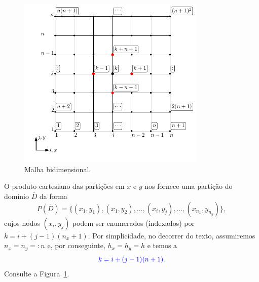 \begin{figure}[H]
  \centering
  \includegraphics[width=0.8\textwidth]{./cap_edp/dados/figMalha2D/fig}
  \caption{Malha bidimensional.}
  \label{cap_edp_sec_poisson:fig:malha2D}
\end{figure}

O produto cartesiano das partições em $x$ e $y$ nos fornece uma partição do domínio $\overline{D}$ da forma
\begin{equation}
  P(\overline{D}) = \{(x_1, y_1), (x_1, y_2), \dotsc, (x_i, y_j), \dotsc, (x_{n_x}, y_{n_y})\},
\end{equation}
cujos nodos $(x_i, y_j)$ podem ser enumerados (indexados) por $k = i + (j-1)(n_x+1)$.  Por simplicidade, no decorrer do texto, assumiremos $n_x=n_y=:n$ e, por conseguinte, $h_x=h_y=h$ e temos a 
\begin{equation}\label{cap_edp_sec_poisson:eq:enum}\color{blue}k = i + (j-1)(n+1).
\end{equation}
Consulte a Figura~\ref{cap_edp_sec_poisson:fig:malha2D}.

\begin{flushleft}
\end{flushleft}

